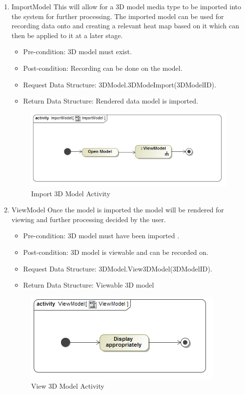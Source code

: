 	\begin{enumerate}
		\item{ImportModel}
		\newline
		This will allow for a 3D model media type to be imported into the system for further processing. The imported model can be used for recording data onto and creating a relevant heat map based on it which can then be applied to it at a later stage.
		\begin{itemize}
			\item Pre-condition: 3D model must exist.
			\item Post-condition: Recording can be done on the model.
			\item Request Data Structure: 3DModel.3DModeImport(3DModelID).
			\item Return Data Structure: Rendered data model is imported.
		\end{itemize}
		
		\begin{figure}[!ht]
			\centering
			\includegraphics[scale=0.5]{Diagrams/Activity_Diagram__ImportModel__ImportModel.png}
			\caption{Import 3D Model Activity}
		\end{figure}
	
		\item{ViewModel}
		Once the model is imported the model will be rendered for viewing and further processing decided by the user.
		\begin{itemize}
			\item Pre-condition: 3D model must have been imported .
			\item Post-condition: 3D model is viewable and can be recorded on.
			\item Request Data Structure: 3DModel.View3DModel(3DModelID).
			\item Return Data Structure: Viewable 3D model
		\end{itemize}
		\begin{figure}[!ht]
			\centering
			\includegraphics[scale=0.5]{Diagrams/Activity_Diagram__ViewModel__ViewModel.png}
		\caption{View 3D Model Activity}
		\end{figure}
		

\end{enumerate}
